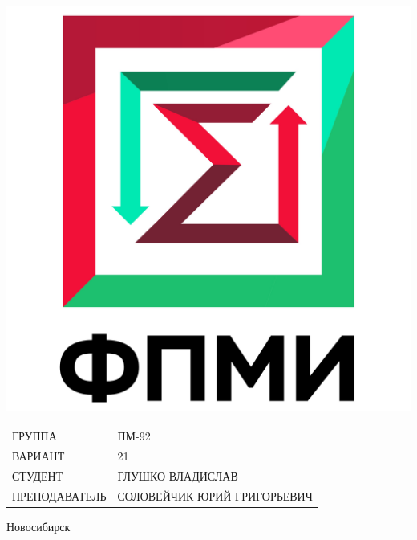 \documentclass[12pt,a4paper]{article}
\begin{document}
\begin{center}
\begin{minipage}{0.3 \textwidth}
	\includegraphics[scale=0.2]{images/fami_emblem}
\end{minipage}%
\hfill
\begin{minipage}{0.7 \textwidth}
	\begin{flushleft}

	\renewcommand{\arraystretch}{1.4}
	\begin{tabular}{ll}
		\uppercase{Группа}			& ПМ-92 						\\
		\uppercase{Вариант}			& 21     						\\

		\uppercase{Студент}		    & \uppercase{Глушко Владислав}	\\
		\uppercase{Преподаватель}	& \uppercase{Соловейчик Юрий Григорьевич} 	\\
	\end{tabular}
	\renewcommand{\arraystretch}{1.0}

	\end{flushleft}
\end{minipage}%

\begin{Large}

\vspace{32mm}

Новосибирск \\

\end{Large}
\end{center}

\newpage
\end{document}
